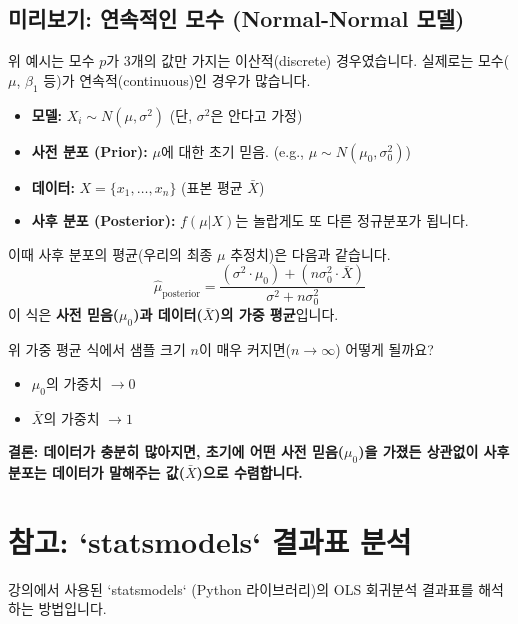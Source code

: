\documentclass[11pt,a4paper]{book}
\theoremstyle{definition}
\begin{document}
\subsection{미리보기: 연속적인 모수 (Normal-Normal 모델)}

위 예시는 모수 $p$가 3개의 값만 가지는 이산적(discrete) 경우였습니다.
실제로는 모수($\mu$, $\beta_1$ 등)가 연속적(continuous)인 경우가 많습니다.

\begin{itemize}
    \item \textbf{모델:} $X_i \sim N(\mu, \sigma^2)$ (단, $\sigma^2$은 안다고 가정)
    \item \textbf{사전 분포 (Prior):} $\mu$에 대한 초기 믿음. (e.g., $\mu \sim N(\mu_0, \sigma_0^2)$)
    \item \textbf{데이터:} $X = \{x_1, \dots, x_n\}$ (표본 평균 $\bar{X}$)
    \item \textbf{사후 분포 (Posterior):} $f(\mu|X)$는 놀랍게도 또 다른 정규분포가 됩니다.
\end{itemize}

이때 사후 분포의 평균(우리의 최종 $\mu$ 추정치)은 다음과 같습니다.
$$ \hat{\mu}_{\text{posterior}} = \frac{(\sigma^2 \cdot \mu_0) + (n \sigma_0^2 \cdot \bar{X})}{\sigma^2 + n \sigma_0^2} $$
이 식은 \textbf{사전 믿음($\mu_0$)과 데이터($\bar{X}$)의 가중 평균}입니다.

\begin{warningbox}[title=데이터가 사전 믿음을 이긴다]
    위 가중 평균 식에서 샘플 크기 $n$이 매우 커지면($n \to \infty$) 어떻게 될까요?
    \begin{itemize}
        \item $\mu_0$의 가중치 $\rightarrow 0$
        \item $\bar{X}$의 가중치 $\rightarrow 1$
    \end{itemize}
    \textbf{결론: 데이터가 충분히 많아지면, 초기에 어떤 사전 믿음($\mu_0$)을 가졌든 상관없이 사후 분포는 데이터가 말해주는 값($\bar{X}$)으로 수렴합니다.}
\end{warningbox}


\section{참고: `statsmodels` 결과표 분석}

강의에서 사용된 `statsmodels` (Python 라이브러리)의 OLS 회귀분석 결과표를 해석하는 방법입니다.
\end{document}
